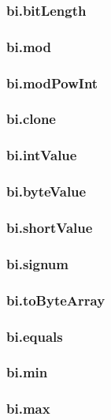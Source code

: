 \subsubsection*{bi.\+bit\+Length}

\subsubsection*{bi.\+mod}

\subsubsection*{bi.\+mod\+Pow\+Int}

\subsubsection*{bi.\+clone}

\subsubsection*{bi.\+int\+Value}

\subsubsection*{bi.\+byte\+Value}

\subsubsection*{bi.\+short\+Value}

\subsubsection*{bi.\+signum}

\subsubsection*{bi.\+to\+Byte\+Array}

\subsubsection*{bi.\+equals}

\subsubsection*{bi.\+min}

\subsubsection*{bi.\+max}

